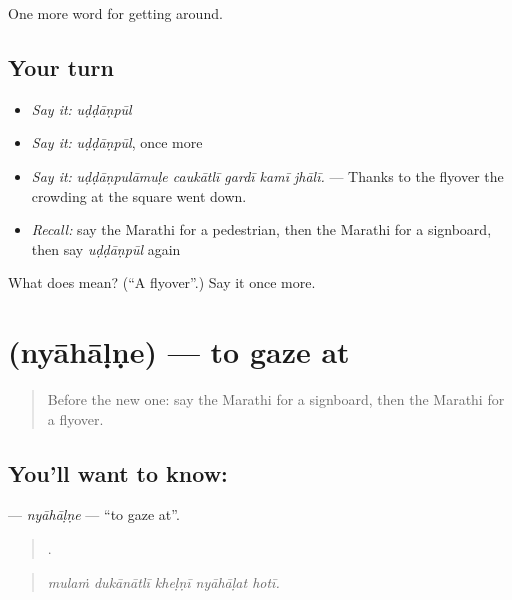 \begin{grammarlens}[title={What you've built}]
One more word for getting around.
\end{grammarlens}

\subsection*{Your turn}
\begin{itemize}
\raggedright
  \item \emph{Say it:} \emph{uḍḍāṇpūl}
  \item \emph{Say it:} \emph{uḍḍāṇpūl}, once more
  \item \emph{Say it:} \emph{uḍḍāṇpulāmuḷe caukātlī gardī kamī jhālī.} — Thanks to the flyover the crowding at the square went down.
  \item \emph{Recall:} say the Marathi for a pedestrian, then the Marathi for a signboard, then say \emph{uḍḍāṇpūl} again
\end{itemize}

\begin{tcolorbox}[breakable,colback=teal!4,colframe=teal!35!black,title={Before you move on}]
What does  mean? (\textquotedblleft{}A flyover\textquotedblright{}.) Say it once more.
\end{tcolorbox}
\section[\texorpdfstring{\mr{न्याहाळणे} (nyāhāḷṇe)}{न्याहाळणे (nyāhāḷṇe)}]{ (nyāhāḷṇe) — to gaze at}

\label{lesson:MR-C406-nyahalne}



\begin{quote}
Before the new one: say the Marathi for a signboard, then the Marathi for a flyover.
\end{quote}

\subsection*{You'll want to know: }
\textbf{} — \emph{nyāhāḷṇe} — \textquotedblleft{}to gaze at\textquotedblright{}.

\begin{quote}
    .
\end{quote}

\begin{quote}
\emph{mulaṁ dukānātlī kheḷṇī nyāhāḷat hotī.}
\end{quote}

